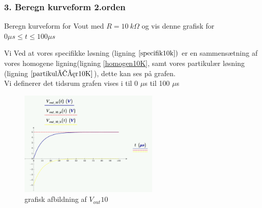 \subsubsection*{3. Beregn kurveform 2.orden}
Beregn kurveform for Vout med $R= 10\ k\Omega$
og vis denne grafisk for $0 \mu s \leq t \leq 100 \mu s$ 

Vi Ved at vores specifikke løsning (ligning $\ref{specifik10k})$ er en sammensætning af vores homogene ligning(ligning \ref{homogen10K}, samt vores partikulær løsning (ligning $\ref{partikulÃ¦r10K}$), dette kan ses på grafen.\\
Vi definerer det tidsrum grafen vises i til 0 $\mu$s til 100 $\mu$s

\begin{figure}[h]
 \begin{center}
  \includegraphics[height=5cm]{P_Fig/figur14_ana2graf10K}
  \caption{grafisk afbildning af $V_{out}{10}$}
  \label{graf10K}
 \end{center}
\end{figure}



